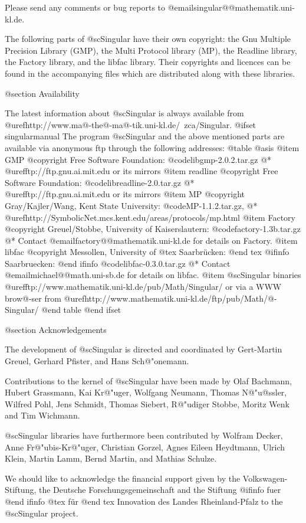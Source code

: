 Please send any comments or bug reports to
@email{singular@@mathematik.uni-kl.de}.

The following parts of @sc{Singular} have their own copyright: the Gnu Multiple
Precision Library (GMP), the Multi Protocol library (MP), the Readline library,
the Factory library, and the libfac library.
Their copyrights and licences can be found in the accompanying files
which are distributed along with these libraries.

@section Availability

The latest information about @sc{Singular} is always available from
@uref{http://www.ma@-the@-ma@-tik.uni-kl.de/~zca/Singular}.
@ifset singularmanual
The program @sc{Singular} and the above mentioned parts are available via
anonymous ftp through the following addresses:
@table @asis
@item GMP
@copyright{} Free Software Foundation:
@code{libgmp-2.0.2.tar.gz}
@* @uref{ftp://ftp.gnu.ai.mit.edu} or its mirrors
@item readline
@copyright{} Free Software Foundation:
@code{libreadline-2.0.tar.gz}
@* @uref{ftp://ftp.gnu.ai.mit.edu} or its mirrors
@item MP
@copyright{} Gray/Kajler/Wang, Kent State University:
@code{MP-1.1.2.tar.gz},
@* @uref{http://SymbolicNet.mcs.kent.edu/areas/protocols/mp.html}
@item Factory
@copyright{} Greuel/Stobbe, University of Kaiserslautern:
@code{factory-1.3b.tar.gz}
@* Contact @email{factory@@mathematik.uni-kl.de} for details on Factory.
@item libfac
@copyright{}  Messollen, University of
@tex
Saarbr\"ucken:
@end tex
@ifinfo
Saarbruecken:
@end ifinfo
@code{libfac-0.3.0.tar.gz}
@* Contact @email{michael@@math.uni-sb.de} for details on libfac.
@item @sc{Singular} binaries
@uref{ftp://www.mathematik.uni-kl.de/pub/Math/Singular/} or via a
WWW brow@-ser from
@uref{http://www.mathematik.uni-kl.de/ftp/pub/Math/@-Singular/}
@end table
@end ifset

@section Acknowledgements

The development of @sc{Singular} is directed and coordinated by
Gert-Martin Greuel, Gerhard Pfister, and Hans
Sch@"onemann.

Contributions to the kernel of @sc{Singular} have been made by
Olaf Bachmann,
Hubert Grassmann,
Kai Kr@"uger,
Wolfgang Neumann,
Thomas N@"u@ss{}ler,
Wilfred Pohl,
Jens Schmidt,
Thomas Siebert,
R@"udiger Stobbe,
Moritz Wenk
and
Tim Wichmann.

@sc{Singular} libraries have furthermore been contributed by
Wolfram Decker,
Anne Fr@"ubis-Kr@"uger,
Christian Gorzel,
Agnes Eileen Heydtmann,
Ulrich Klein,
Martin Lamm,
Bernd Martin,
and
Mathias Schulze.

We should like to acknowledge the financial support given by
the Volkswagen-Stiftung,
the Deutsche Forschungsgemeinschaft
and the Stiftung
@ifinfo
fuer
@end ifinfo
@tex
f\"ur
@end tex
Innovation des Landes Rheinland-Pfalz
to the
@sc{Singular} project.


